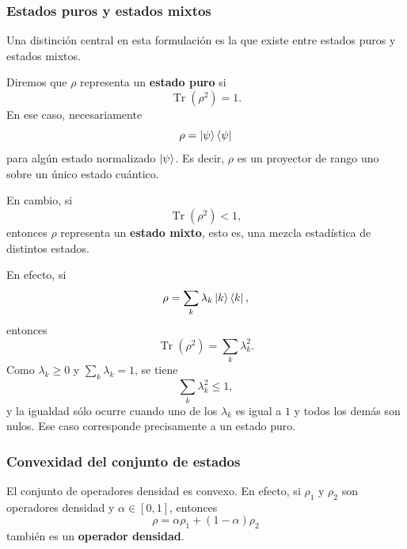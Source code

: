 \documentclass[12pt,a4paper]{article}
\theoremstyle{definition}
\theoremstyle{plain}
\theoremstyle{remark}
\begin{document}
\subsubsection*{Estados puros y estados mixtos}

Una distinción central en esta formulación es la que existe entre estados puros y estados mixtos.

Diremos que $\rho$ representa un \textbf{estado puro} si
\begin{equation*}
    \operatorname{Tr}(\rho^2)=1.
\end{equation*}
En ese caso, necesariamente
\begin{equation*}
    \rho = \ket{\psi}\bra{\psi}
\end{equation*}
para algún estado normalizado $\ket{\psi}$. Es decir, $\rho$ es un proyector de rango uno sobre un único estado cuántico.

En cambio, si
\begin{equation*}
    \operatorname{Tr}(\rho^2)<1,
\end{equation*}
entonces $\rho$ representa un \textbf{estado mixto}, esto es, una mezcla estadística de distintos estados.

En efecto, si
\begin{equation*}
    \rho=\sum_k \lambda_k \ket{k}\bra{k},
\end{equation*}
entonces
\begin{equation*}
    \operatorname{Tr}(\rho^2)=\sum_k \lambda_k^2.
\end{equation*}
Como $\lambda_k\geq 0$ y $\sum_k\lambda_k=1$, se tiene
\begin{equation*}
    \sum_k \lambda_k^2 \leq 1,
\end{equation*}
y la igualdad sólo ocurre cuando uno de los $\lambda_k$ es igual a $1$ y todos los demás son nulos. Ese caso corresponde precisamente a un estado puro.

\subsubsection*{Convexidad del conjunto de estados}

El conjunto de operadores densidad es convexo. En efecto, si $\rho_1$ y $\rho_2$ son operadores densidad y $\alpha\in[0,1]$, entonces
\begin{equation*}
    \rho = \alpha \rho_1 + (1-\alpha)\rho_2
\end{equation*}
también es un \textbf{operador densidad}.
\end{document}
